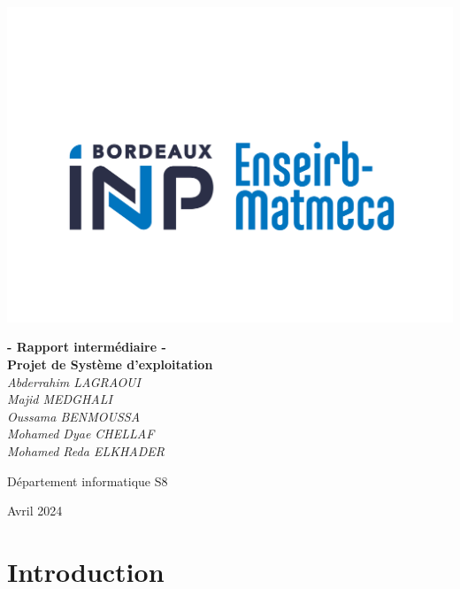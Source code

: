 \documentclass[11pt]{article}
\begin{document}
\begin{titlepage}
    \centerline{\includegraphics[scale=0.3]{Logo.png}}
    \centering
        \vspace{1cm}
    {\huge\bfseries - Rapport intermédiaire - \\}
    {\huge\bfseries Projet de Système d'exploitation \\}
	\vspace{2cm}
    {\Large\itshape Abderrahim LAGRAOUI   \\ Majid MEDGHALI \\ Oussama BENMOUSSA \\ Mohamed Dyae CHELLAF \\ Mohamed Reda ELKHADER \\}
    \vspace{2cm}
	{\Large Département informatique S8\par}
    {\Large Avril 2024\par}
\end{titlepage}

\section{Introduction}
\end{document}
